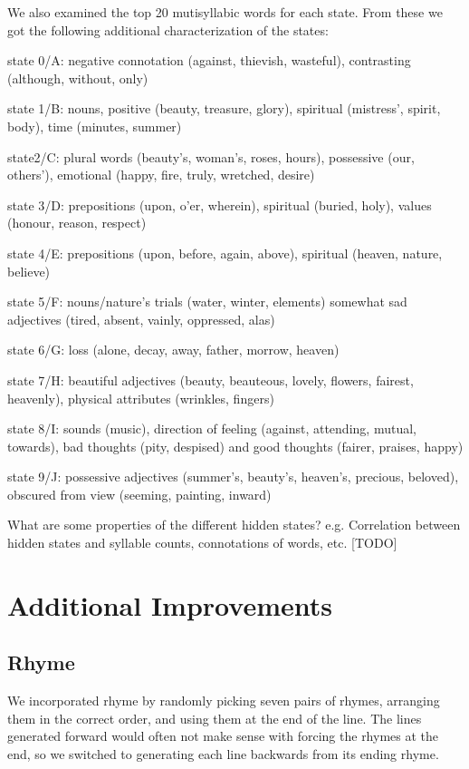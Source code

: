 We also examined the top 20 mutisyllabic words for each state. From these we got the following additional characterization of the states:
\begin{compactitem}
\item state 0/A: negative connotation (against, thievish, wasteful), contrasting (although, without, only)
\item state 1/B: nouns, positive (beauty, treasure, glory), spiritual (mistress', spirit, body), time (minutes, summer)
\item state2/C: plural words (beauty's, woman's, roses, hours), possessive (our, others'), emotional (happy, fire, truly, wretched, desire)
\item state 3/D: prepositions (upon, o'er, wherein), spiritual (buried, holy), values (honour, reason, respect)
\item state 4/E: prepositions (upon, before, again, above), spiritual (heaven, nature, believe)
\item state 5/F: nouns/nature's trials (water, winter, elements) somewhat sad adjectives (tired, absent, vainly, oppressed, alas)
\item state 6/G: loss (alone, decay, away, father, morrow, heaven)
\item state 7/H: beautiful adjectives (beauty, beauteous, lovely, flowers, fairest, heavenly), physical attributes (wrinkles, fingers)
\item state 8/I: sounds (music), direction of feeling (against, attending, mutual, towards), bad thoughts (pity, despised) and good thoughts (fairer, praises, happy)
\item state 9/J: possessive adjectives (summer's, beauty's, heaven's, precious, beloved), obscured from view (seeming, painting, inward)
\end{compactitem}




What are some properties of the different hidden states?
e.g. Correlation between hidden states and syllable counts, connotations of words, etc.
[TODO]


\section{Additional Improvements}
\subsection{Rhyme}
We incorporated rhyme by randomly picking seven pairs of rhymes, arranging them in the correct order, and using them at the end of the line. The lines generated forward would often not make sense with forcing the rhymes at the end, so we switched to generating each line backwards from its ending rhyme.

